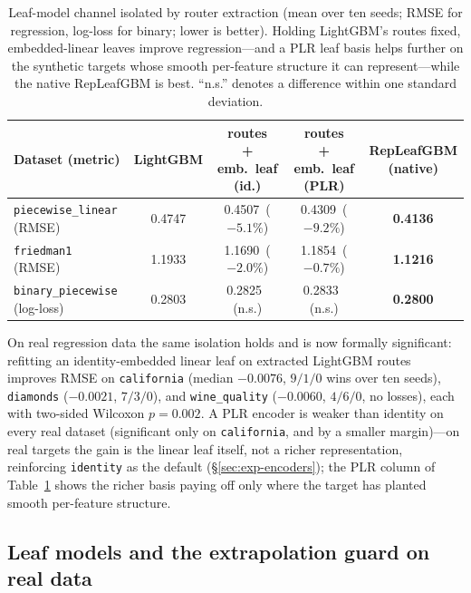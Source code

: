 \documentclass[11pt]{article}
\begin{document}
\begin{table}[t]
\centering
\caption{Leaf-model channel isolated by router extraction (mean over ten seeds; RMSE for
regression, log-loss for binary; lower is better). Holding LightGBM's routes fixed,
embedded-linear leaves improve regression---and a PLR leaf basis helps further on the
synthetic targets whose smooth per-feature structure it can represent---while the native
RepLeafGBM is best. ``n.s.'' denotes a difference within one standard deviation.}
\label{tab:routerx}
\begin{tabular}{lcccc}
\toprule
Dataset (metric) & LightGBM & \makecell{routes\\+ emb.\ leaf (id.)} & \makecell{routes\\+ emb.\ leaf (PLR)} & \makecell{RepLeafGBM\\(native)} \\
\midrule
\texttt{piecewise\_linear} (RMSE) & 0.4747 & 0.4507 \,($-5.1\%$) & 0.4309 \,($-9.2\%$) & \textbf{0.4136} \\
\texttt{friedman1} (RMSE)         & 1.1933 & 1.1690 \,($-2.0\%$) & 1.1854 \,($-0.7\%$) & \textbf{1.1216} \\
\texttt{binary\_piecewise} (log-loss) & 0.2803 & 0.2825 \,(n.s.) & 0.2833 \,(n.s.) & \textbf{0.2800} \\
\bottomrule
\end{tabular}
\end{table}

On real regression data the same isolation holds and is now formally significant:
refitting an identity-embedded linear leaf on extracted LightGBM routes improves RMSE on
\texttt{california} (median $-0.0076$, $9/1/0$ wins over ten seeds),
\texttt{diamonds} ($-0.0021$, $7/3/0$), and \texttt{wine\_quality} ($-0.0060$, $4/6/0$,
no losses), each with two-sided Wilcoxon $p=0.002$. A PLR encoder is weaker than
identity on every real dataset (significant only on \texttt{california}, and by a smaller
margin)---on real targets the gain is the linear leaf itself, not a richer
representation, reinforcing \texttt{identity} as the default (\S\ref{sec:exp-encoders});
the PLR column of Table~\ref{tab:routerx} shows the richer basis paying off only where
the target has planted smooth per-feature structure.

\subsection{Leaf models and the extrapolation guard on real data}
\label{sec:exp-guard}
\end{document}
